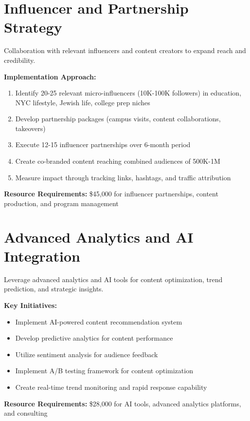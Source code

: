 \documentclass[12pt]{report}
\begin{document}
\section{Influencer and Partnership Strategy}

Collaboration with relevant influencers and content creators to expand reach and credibility.

\textbf{Implementation Approach:}

\begin{enumerate}
\item Identify 20-25 relevant micro-influencers (10K-100K followers) in education, NYC lifestyle, Jewish life, college prep niches
\item Develop partnership packages (campus visits, content collaborations, takeovers)
\item Execute 12-15 influencer partnerships over 6-month period
\item Create co-branded content reaching combined audiences of 500K-1M
\item Measure impact through tracking links, hashtags, and traffic attribution
\end{enumerate}

\textbf{Resource Requirements:} \$45,000 for influencer partnerships, content production, and program management

\section{Advanced Analytics and AI Integration}

Leverage advanced analytics and AI tools for content optimization, trend prediction, and strategic insights.

\textbf{Key Initiatives:}

\begin{itemize}
\item Implement AI-powered content recommendation system
\item Develop predictive analytics for content performance
\item Utilize sentiment analysis for audience feedback
\item Implement A/B testing framework for content optimization
\item Create real-time trend monitoring and rapid response capability
\end{itemize}

\textbf{Resource Requirements:} \$28,000 for AI tools, advanced analytics platforms, and consulting
\end{document}
